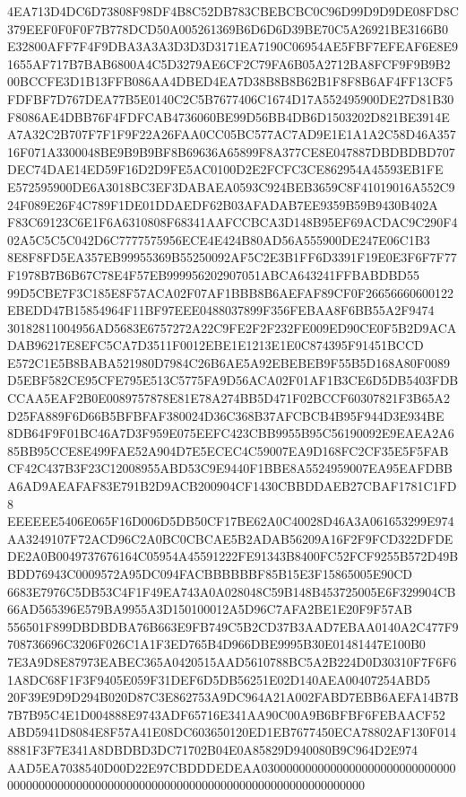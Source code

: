 \documentclass[UTF8,fontset=fandol,zihao=-4,a4paper]{ctexart}
\begin{document}
{{4EA713D4DC6D73808F98DF4B8C52DB783CBEBCBC0C96D99D9D9DE08FD8C379EEF0F0F0F7B778DCD50A005261369B6D6D6D39BE70C5A26921BE3166B0
E32800AFF7F4F9DBA3A3A3D3D3D3171EA7190C06954AE5FBF7EFEAF6E8E91655AF717B7BAB6800A4C5D3279AE6CF2C79FA6B05A2712BA8FCF9F9B9B2
00BCCFE3D1B13FFB086AA4DBED4EA7D38B8B8B62B1F8F8B6AF4FF13CF5FDFBF7D767DEA77B5E0140C2C5B7677406C1674D17A552495900DE27D81B30
F8086AE4DBB76F4FDFCAB4736060BE99D56BB4DB6D1503202D821BE3914EA7A32C2B707F7F1F9F22A26FAA0CC05BC577AC7AD9E1E1A1A2C58D46A357
16F071A3300048BE9B9B9BF8B69636A65899F8A377CE8E047887DBDBDBD707DEC74DAE14ED59F16D2D9FE5AC0100D2E2FCFC3CE862954A45593EB1FE
E572595900DE6A3018BC3EF3DABAEA0593C924BEB3659C8F41019016A552C924F089E26F4C789F1DE01DDAEDF62B03AFADAB7EE9359B59B9430B402A
F83C69123C6E1F6A6310808F68341AAFCCBCA3D148B95EF69ACDAC9C290F402A5C5C5C042D6C7777575956ECE4E424B80AD56A555900DE247E06C1B3
8E8F8FD5EA357EB99955369B55250092AF5C2E3B1FF6D3391F19E0E3F6F7F77F1978B7B6B67C78E4F57EB999956202907051ABCA643241FFBABDBD55
99D5CBE7F3C185E8F57ACA02F07AF1BBB8B6AEFAF89CF0F26656660600122EBEDD47B15854964F11BF97EEE0488037899F356FEBAA8F6BB55A2F9474
30182811004956AD5683E6757272A22C9FE2F2F232FE009ED90CE0F5B2D9ACADAB96217E8EFC5CA7D3511F0012EBE1E1213E1E0C874395F91451BCCD
E572C1E5B8BABA521980D7984C26B6AE5A92EBEBEB9F55B5D168A80F0089D5EBF582CE95CFE795E513C5775FA9D56ACA02F01AF1B3CE6D5DB5403FDB
CCAA5EAF2B0E0089757878E81E78A274BB5D471F02BCCF60307821F3B65A2D25FA889F6D66B5BFBFAF380024D36C368B37AFCBCB4B95F944D3E934BE
8DB64F9F01BC46A7D3F959E075EEFC423CBB9955B95C56190092E9EAEA2A685BB95CCE8E499FAE52A904D7E5ECEC4C59007EA9D168FC2CF35E5F5FAB
CF42C437B3F23C12008955ABD53C9E9440F1BBE8A5524959007EA95EAFDBBA6AD9AEAFAF83E791B2D9ACB200904CF1430CBBDDAEB27CBAF1781C1FD8
EEEEEE5406E065F16D006D5DB50CF17BE62A0C40028D46A3A061653299E974AA3249107F72ACD96C2A0BC0CBCAE5B2ADAB56209A16F2F9FCD322DFDE
DE2A0B0049737676164C05954A45591222FE91343B8400FC52FCF9255B572D49BBDD76943C0009572A95DC094FACBBBBBBF85B15E3F15865005E90CD
6683E7976C5DB53C4F1F49EA743A0A028048C59B148B453725005E6F329904CB66AD565396E579BA9955A3D150100012A5D96C7AFA2BE1E20F9F57AB
556501F899DBDBDBA76B663E9FB749C5B2CD37B3AAD7EBAA0140A2C477F9708736696C3206F026C1A1F3ED765B4D966DBE9995B30E01481447E100B0
7E3A9D8E87973EABEC365A0420515AAD5610788BC5A2B224D0D30310F7F6F61A8DC68F1F3F9405E059F31DEF6D5DB56251E02D140AEA00407254ABD5
20F39E9D9D294B020D87C3E862753A9DC964A21A002FABD7EBB6AEFA14B7B7B7B95C4E1D004888E9743ADF65716E341AA90C00A9B6BFBF6FEBAACF52
ABD5941D8084E8F57A41E08DC603650120ED1EB7677450ECA78802AF130F0148881F3F7E341A8DBDBD3DC71702B04E0A85829D940080B9C964D2E974
AAD5EA7038540D00D22E97CBDDDEDEAA0300000000000000000000000000000000000000000000000000000000000000000000000000000000000000
}}
\end{document}
